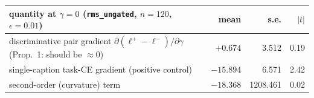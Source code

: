 \begin{tabular}{@{}lrrr@{}}
\toprule
quantity at $\gamma{=}0$ (\texttt{rms\_ungated}, $n{=}120$, $\epsilon{=}0.01$) & mean & s.e. & $|t|$ \\
\midrule
discriminative pair gradient $\partial(\ell^+{-}\ell^-)/\partial\gamma$ (Prop.~1: should be ${\approx}0$) & $+0.674$ & 3.512 & 0.19 \\
single-caption task-CE gradient (positive control) & $-15.894$ & 6.571 & 2.42 \\
second-order (curvature) term & $-18.368$ & 1208.461 & 0.02 \\
\bottomrule
\end{tabular}
